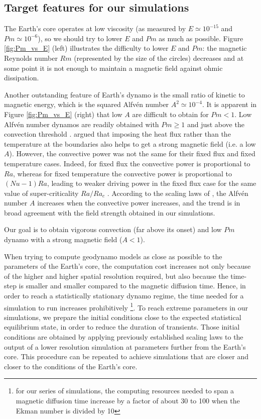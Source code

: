 \documentclass[12pt, a4paper]{article}
\begin{document}
\subsection{Target features for our simulations}

The Earth's core operates at low viscosity (as measured by $E \simeq 10^{-15}$ and $Pm \simeq 10^{-6}$), so we should try to lower $E$ and $Pm$ as much as possible.
Figure \ref{fig:Pm_vs_E} (left) illustrates the difficulty to lower $E$ and $Pm$: the magnetic Reynolds number $Rm$ (represented by the size of the circles) decreases and at some point it is not enough to maintain a magnetic field against ohmic dissipation.

Another outstanding feature of Earth's dynamo is the small ratio of kinetic to magnetic energy, which is the squared Alfvén number $A^2 \simeq 10^{-4}$.
It is apparent in Figure \ref{fig:Pm_vs_E} (right) that low $A$ are difficult to obtain for $Pm<1$.
Low Alfv\'en number dynamos are readily obtained with $Pm \geq 1$ \citep[e.g.][]{kageyama2008, dormy2016} and just above the convection threshold \citep[e.g.][]{takahashi2012}.
\citet{sakuraba2009} argued that imposing the heat flux rather than the temperature at the boundaries also helps to get a strong magnetic field (i.e. a low $A$).
However, the convective power was not the same for their fixed flux and fixed temperature cases.
Indeed, for fixed flux the convective power is proportional to $Ra$, whereas for fixed temperature the convective power is proportional to $(Nu-1)Ra$, leading to weaker driving power in the fixed flux case for the same value of super-criticality $Ra/Ra_c$ \citep[Fig. 1]{aubert2017}.
According to the scaling laws of \citet{christensen2006}, the Alfvén number $A$ increases when the convective power increases, and the trend is in broad agreement with the field strength obtained in our simulations.

Our goal is to obtain vigorous convection (far above its onset) and low $Pm$ dynamo with a strong magnetic field ($A < 1$).

When trying to compute geodynamo models as close as possible to the parameters of the Earth's core, the computation cost increases not only because of the higher and higher spatial resolution required, but also because the time-step is smaller and smaller compared to the magnetic diffusion time.
Hence, in order to reach a statistically stationary dynamo regime, the time needed for a simulation to run increases prohibitively \footnote{for our series of simulations, the computing resources needed to span a magnetic diffusion time increase by a factor of about 30 to 100 when the Ekman number is divided by 10}.
To reach extreme parameters in our simulations, we prepare the initial conditions close to the expected statistical equilibrium state, in order to reduce the duration of transients.
Those initial conditions are obtained by applying previously established scaling laws \citep{christensen2006} to the output of a lower resolution simulation at parameters further from the Earth's core.
This procedure can be repeated to achieve simulations that are closer and closer to the conditions of the Earth's core.
\end{document}
